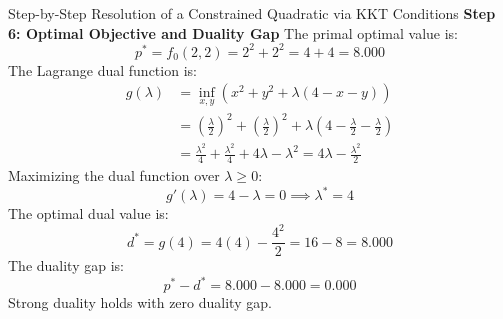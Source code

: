\begin{examplebox}[breakable]{Step-by-Step Resolution of a Constrained Quadratic via KKT Conditions}
\textbf{Step 6: Optimal Objective and Duality Gap}
The primal optimal value is:
\begin{equation}
p^* = f_0(2, 2) = 2^2 + 2^2 = 4 + 4 = 8.000
\end{equation}
The Lagrange dual function is:
\begin{align}
g(\lambda) &= \inf_{x, y} \left( x^2 + y^2 + \lambda(4 - x - y) \right) \nonumber \\
&= \left(\frac{\lambda}{2}\right)^2 + \left(\frac{\lambda}{2}\right)^2 + \lambda\left(4 - \frac{\lambda}{2} - \frac{\lambda}{2}\right) \nonumber \\
&= \frac{\lambda^2}{4} + \frac{\lambda^2}{4} + 4\lambda - \lambda^2 = 4\lambda - \frac{\lambda^2}{2}
\end{align}
Maximizing the dual function over $\lambda \ge 0$:
\begin{equation}
g'(\lambda) = 4 - \lambda = 0 \implies \lambda^* = 4
\end{equation}
The optimal dual value is:
\begin{equation}
d^* = g(4) = 4(4) - \frac{4^2}{2} = 16 - 8 = 8.000
\end{equation}
The duality gap is:
\begin{equation}
p^* - d^* = 8.000 - 8.000 = 0.000
\end{equation}
Strong duality holds with zero duality gap.
\end{examplebox}

